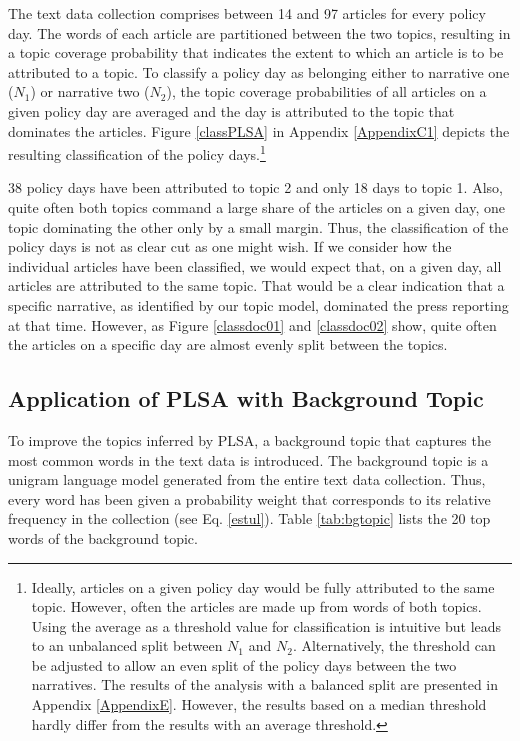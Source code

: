 \documentclass[11pt,a4paper,english,oneside]{book}
\numberwithin{equation}{chapter}
\begin{document}
The text data collection comprises between 14 and 97 articles for every policy day. The words of each article are partitioned between the two topics, resulting in a topic coverage probability that indicates the extent to which an article is to be attributed to a topic. To classify a policy day as belonging either to narrative one ($N_1$) or narrative two ($N_2$), the topic coverage probabilities of all articles on a given policy day are averaged and the day is attributed to the topic that dominates the articles. Figure \ref{classPLSA} in Appendix \ref{AppendixC1} depicts the resulting classification of the policy days.\footnote{Ideally, articles on a given policy day would be fully attributed to the same topic. However, often the articles are made up from words of both topics. Using the average as a threshold value for classification is intuitive but leads to an unbalanced split between $N_1$ and $N_2$. Alternatively, the threshold can be adjusted to allow an even split of the policy days between the two narratives. The results of the analysis with a balanced split are presented in Appendix \ref{AppendixE}. However, the results based on a median threshold hardly differ from the results with an average threshold.}

38 policy days have been attributed to topic 2 and only 18 days to topic 1. Also, quite often both topics command a large share of the articles on a given day, one topic dominating the other only by a small margin. Thus, the classification of the policy days is not as clear cut as one might wish. If we consider how the individual articles have been classified, we would expect that, on a given day, all articles are attributed to the same topic. That would be a clear indication that a specific narrative, as identified by our topic model, dominated the press reporting at that time. However, as Figure \ref{classdoc01} and \ref{classdoc02} show, quite often the articles on a specific day are almost evenly split between the topics.  

\subsection{Application of PLSA with Background Topic}\label{Ch:implembg}

To improve the topics inferred by PLSA, a background topic that captures the most common words in the text data is introduced. The background topic is a unigram language model generated from the entire text data collection. Thus, every word has been given a probability weight that corresponds to its relative frequency in the collection (see Eq. \ref{estul}). Table \ref{tab:bgtopic} lists the 20 top words of the background topic. 
\end{document}
